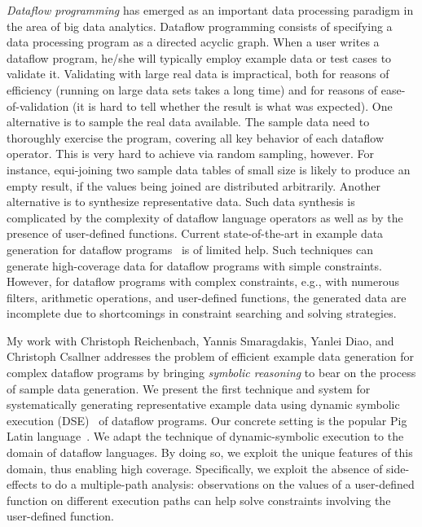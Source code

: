 \documentclass[proposal]{umthesis} %
\begin{document}
\emph{Dataflow programming} has emerged as an important data
processing paradigm in the area of big data analytics. Dataflow
programming consists of specifying a data processing program as a
directed acyclic graph. 
When a user writes a dataflow program, he/she will typically employ
example data or test cases to validate it. Validating with large real
data is impractical, both for reasons of efficiency (running on large
data sets takes a long time) and for reasons of ease-of-validation (it
is hard to tell whether the result is what was expected). One
alternative is to sample the real data available. The sample data need
to thoroughly exercise the program, covering all key behavior of each
dataflow operator. This is very hard to achieve via random sampling,
however. For instance, equi-joining two sample data tables of small
size is likely to produce an empty result, if the values being joined
are distributed arbitrarily.
Another alternative is to synthesize representative data.  Such data
synthesis is complicated by the complexity of dataflow language
operators as well as by the presence of user-defined functions.
Current state-of-the-art in example data generation for dataflow
programs~\cite{Olston:2009:GED:1559845.1559873} is of limited
help. Such techniques can generate high-coverage data for dataflow
programs with simple constraints. However, for dataflow programs with
complex constraints, e.g., with numerous filters, arithmetic
operations, and user-defined functions, the generated data are
incomplete due to shortcomings in constraint searching and solving
strategies.

My work \cite{6693083} with Christoph Reichenbach, Yannis Smaragdakis, Yanlei Diao, and Christoph Csallner addresses the problem of efficient example data
generation for complex dataflow programs by bringing {\em
  symbolic reasoning} to bear on the process of sample data
generation.  We present the first technique and system for
systematically generating representative example data using dynamic
symbolic execution (DSE)~\cite{godefroid05dart,cadar05execution,tillmann:08} of dataflow programs.  Our
concrete setting is the popular Pig Latin
language~\cite{Olston:2008:PLN:1376616.1376726}.  We adapt the technique of dynamic-symbolic execution to the domain of dataflow languages. By doing so, we exploit the unique features of this domain, thus enabling high coverage. Specifically,
  we exploit the absence of side-effects to do a
  multiple-path analysis: observations on the values of a user-defined
  function on different execution paths can help solve constraints
  involving the user-defined function.
\end{document}
